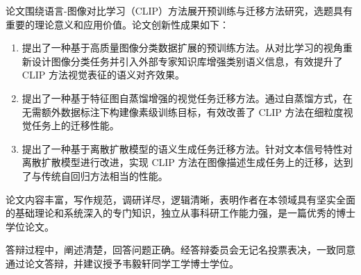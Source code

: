 \begin{resolution}
论文围绕语言-图像对比学习（CLIP）方法展开预训练与迁移方法研究，选题具有重要的理论意义和应用价值。论文创新性成果如下：
\begin{enumerate}
    \item 提出了一种基于高质量图像分类数据扩展的预训练方法。从对比学习的视角重新设计图像分类任务并引入外部专家知识库增强类别语义信息，有效提升了 CLIP 方法视觉表征的语义对齐效果。
    \item 提出了一种基于特征图自蒸馏增强的视觉任务迁移方法。通过自蒸馏方式，在无需额外数据标注下构建像素级训练目标，有效改善了 CLIP 方法在细粒度视觉任务上的迁移性能。
    \item 提出了一种基于离散扩散模型的语义生成任务迁移方法。针对文本信号特性对离散扩散模型进行改进，实现 CLIP 方法在图像描述生成任务上的迁移，达到了与传统自回归方法相当的性能。
\end{enumerate}

论文内容丰富，写作规范，调研详尽，逻辑清晰，表明作者在本领域具有坚实全面的基础理论和系统深入的专门知识，独立从事科研工作能力强，是一篇优秀的博士学位论文。

答辩过程中，阐述清楚，回答问题正确。经答辩委员会无记名投票表决，一致同意通过论文答辩，并建议授予韦毅轩同学工学博士学位。







\end{resolution}
